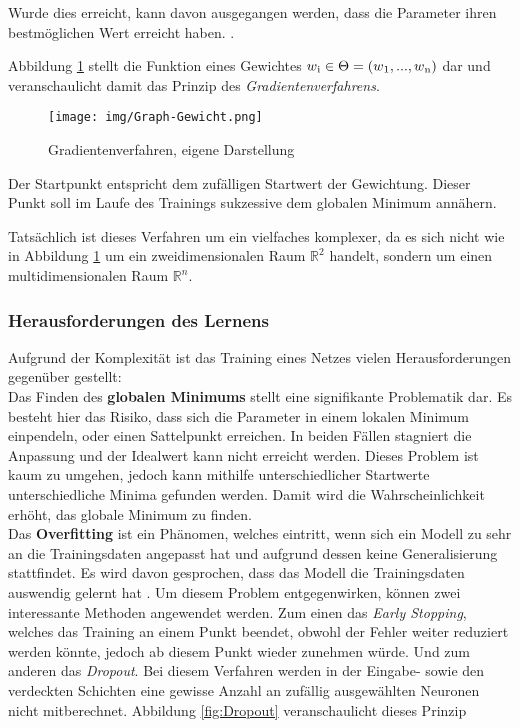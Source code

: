 Wurde dies erreicht, kann davon ausgegangen werden, dass die Parameter ihren bestmöglichen Wert erreicht haben. \cite[vgl.][]{12, 13, 21}. 

Abbildung \ref{fig:Gradientenverfahren} stellt die Funktion eines Gewichtes $w\textsubscript{i} \in \Theta = (w\textsubscript{1}, ..., w\textsubscript{n})$ dar und veranschaulicht damit das Prinzip des \textit{Gradientenverfahrens}. 

\begin{figure}[H]
	\centering
	\texttt{[image: img/Graph-Gewicht.png]}
	\caption{Gradientenverfahren, eigene Darstellung}
	\label{fig:Gradientenverfahren}
\end{figure}

Der Startpunkt entspricht dem zufälligen Startwert der Gewichtung. Dieser Punkt soll im Laufe des Trainings sukzessive dem globalen Minimum annähern.

Tatsächlich ist dieses Verfahren um ein vielfaches komplexer, da es sich nicht wie in Abbildung \ref{fig:Gradientenverfahren} um ein zweidimensionalen Raum $\mathbb{R}^2$ handelt, sondern um einen multidimensionalen Raum $\mathbb{R}^n$. \cite[vgl.][S. 79]{12}

\subsubsection{Herausforderungen des Lernens} \label{HerausforderungenDesLernens}
Aufgrund der Komplexität ist das Training eines Netzes vielen Herausforderungen gegenüber gestellt: \\

Das Finden des \textbf{globalen Minimums} stellt eine signifikante Problematik dar. Es besteht hier das Risiko, dass sich die Parameter in einem lokalen Minimum einpendeln, oder einen Sattelpunkt erreichen. In beiden Fällen stagniert die Anpassung und der Idealwert kann nicht erreicht werden. \cite[vgl.][]{21} 
Dieses Problem ist kaum zu umgehen, jedoch kann mithilfe unterschiedlicher Startwerte unterschiedliche Minima gefunden werden. Damit wird die Wahrscheinlichkeit erhöht, das globale Minimum zu finden.\\

Das \textbf{Overfitting} ist ein Phänomen, welches eintritt, wenn sich ein Modell zu sehr an die Trainingsdaten angepasst hat und aufgrund dessen keine Generalisierung stattfindet. Es wird davon gesprochen, dass das Modell die Trainingsdaten \glqq auswendig gelernt\grqq{} hat \cite[vgl.][S.82]{12}. Um diesem Problem entgegenwirken, können zwei interessante Methoden angewendet werden. Zum einen das \textit{Early Stopping}, welches das Training an einem Punkt beendet, obwohl der Fehler weiter reduziert werden könnte, jedoch ab diesem Punkt wieder zunehmen würde. Und zum anderen das \textit{Dropout}. Bei diesem Verfahren werden in der Eingabe- sowie den verdeckten Schichten eine gewisse Anzahl an zufällig ausgewählten Neuronen nicht mitberechnet. Abbildung \ref{fig:Dropout} veranschaulicht dieses Prinzip \cite[vgl.][S. 216 f.]{13} 

